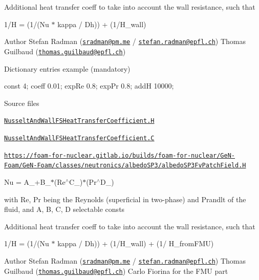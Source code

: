 Additional heat transfer coeff to take into account the wall resistance, such that

1/H = (1/(Nu $\ast$ kappa / Dh)) + (1/\+H\+\_\+wall)

Author Stefan Radman (\href{mailto:sradman@pm.me}{\tt sradman@pm.\+me} / \href{mailto:stefan.radman@epfl.ch}{\tt stefan.\+radman@epfl.\+ch}) Thomas Guilbaud (\href{mailto:thomas.guilbaud@epfl.ch}{\tt thomas.\+guilbaud@epfl.\+ch})

Dictionary entries example (mandatory) \begin{DoxyVerb}    const   4;
    coeff   0.01;
    expRe   0.8;
    expPr   0.8;
    addH    10000;
\end{DoxyVerb}


\begin{DoxyParagraph}{Source files}

\begin{DoxyItemize}
\item \href{../../../home/carlo/data/GeN-Foam/GeN-Foam_ffn/GeN-Foam/GeN-Foam/classes/thermalHydraulics/src/physicsModels/heatTransferModels/FSHeatTransferCoefficientModels/NusseltAndWall/NusseltAndWallFSHeatTransferCoefficient.H}{\tt Nusselt\+And\+Wall\+F\+S\+Heat\+Transfer\+Coefficient.\+H} 
\item \href{../../../home/carlo/data/GeN-Foam/GeN-Foam_ffn/GeN-Foam/GeN-Foam/classes/thermalHydraulics/src/physicsModels/heatTransferModels/FSHeatTransferCoefficientModels/NusseltAndWall/NusseltAndWallFSHeatTransferCoefficient.C}{\tt Nusselt\+And\+Wall\+F\+S\+Heat\+Transfer\+Coefficient.\+C} 
\end{DoxyItemize}\href{https://foam-for-nuclear.gitlab.io/builds/foam-for-nuclear/GeN-Foam/GeN-Foam/classes/neutronics/albedoSP3/albedoSP3FvPatchField.H}{\tt https\+://foam-\/for-\/nuclear.\+gitlab.\+io/builds/foam-\/for-\/nuclear/\+Ge\+N-\/\+Foam/\+Ge\+N-\/\+Foam/classes/neutronics/albedo\+S\+P3/albedo\+S\+P3\+Fv\+Patch\+Field.\+H}
\end{DoxyParagraph}
\label{_Description}%
 Nu = A\+\_\++\+B\+\_\+$\ast$(Re$^\wedge$\+C\+\_\+)$\ast$(Pr$^\wedge$\+D\+\_\+)

with Re, Pr being the Reynolds (superficial in two-\/phase) and Prandlt of the fluid, and A, B, C, D selectable consts

Additional heat transfer coeff to take into account the wall resistance, such that

1/H = (1/(Nu $\ast$ kappa / Dh)) + (1/\+H\+\_\+wall) + (1/ H\+\_\+from\+F\+MU)

Author Stefan Radman (\href{mailto:sradman@pm.me}{\tt sradman@pm.\+me} / \href{mailto:stefan.radman@epfl.ch}{\tt stefan.\+radman@epfl.\+ch}) Thomas Guilbaud (\href{mailto:thomas.guilbaud@epfl.ch}{\tt thomas.\+guilbaud@epfl.\+ch}) Carlo Fiorina for the F\+MU part

